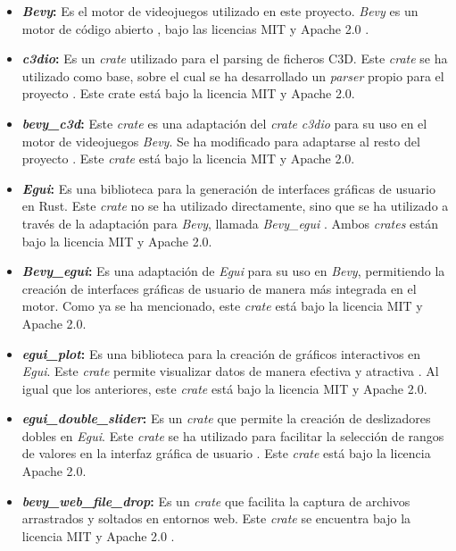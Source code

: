 \begin{itemize}
    \item \textbf{\textit{Bevy}:} Es el motor de videojuegos utilizado en este proyecto. \textit{Bevy} es un motor de código abierto \autocite{BevyEngine}, bajo las licencias MIT \autocite{BevywebsiteLICENSEMain} y Apache 2.0 \autocite{BevyLICENSEAPACHEMain}.
    \item \textbf{\textit{c3dio}:} Es un \textit{crate} utilizado para el parsing de ficheros \ac{C3D}. Este \textit{crate} se ha utilizado como base, sobre el cual se ha desarrollado un \textit{parser} propio para el proyecto \autocite{C3dioRust}. Este crate está bajo la licencia MIT y Apache 2.0.
    \item \textbf{\textit{bevy\_c3d}:} Este \textit{crate} es una adaptación del \textit{crate} \textit{c3dio} para su uso en el motor de videojuegos \textit{Bevy}. Se ha modificado para adaptarse al resto del proyecto \autocite{BiomechanicsfoundationBevy_c3d2024}. Este \textit{crate} está bajo la licencia MIT y Apache 2.0.
    \item \textbf{\textit{Egui}:} Es una biblioteca para la generación de interfaces gráficas de usuario en Rust. Este \textit{crate} no se ha utilizado directamente, sino que se ha utilizado a través de la adaptación para \textit{Bevy}, llamada \textit{Bevy\_egui} \autocite{Bevy_eguiRust,ernerfeldtEmilkEgui2025}. Ambos \textit{crates} están bajo la licencia MIT y Apache 2.0.
    \item \textbf{\textit{Bevy\_egui}:} Es una adaptación de \textit{Egui} para su uso en \textit{Bevy}, permitiendo la creación de interfaces gráficas de usuario de manera más integrada en el motor. Como ya se ha mencionado, este \textit{crate} está bajo la licencia MIT y Apache 2.0.
    \item \textbf{\textit{egui\_plot}:} Es una biblioteca para la creación de gráficos interactivos en \textit{Egui}. Este \textit{crate} permite visualizar datos de manera efectiva y atractiva \autocite{ernerfeldtEmilkEgui_plot2025}. Al igual que los anteriores, este \textit{crate} está bajo la licencia MIT y Apache 2.0.
    \item \textbf{\textit{egui\_double\_slider}:} Es un \textit{crate} que permite la creación de deslizadores dobles en \textit{Egui}. Este \textit{crate} se ha utilizado para facilitar la selección de rangos de valores en la interfaz gráfica de usuario \autocite{hacknusHacknusEgui_double_slider2025}. Este \textit{crate} está bajo la licencia Apache 2.0.
    \item \textbf{\textit{bevy\_web\_file\_drop}:} Es un \textit{crate} que facilita la captura de archivos arrastrados y soltados en entornos web. Este \textit{crate} se encuentra bajo la licencia MIT y Apache 2.0 \autocite{kayhKayhhhBevy_web_file_drop2024}.

\end{itemize}
